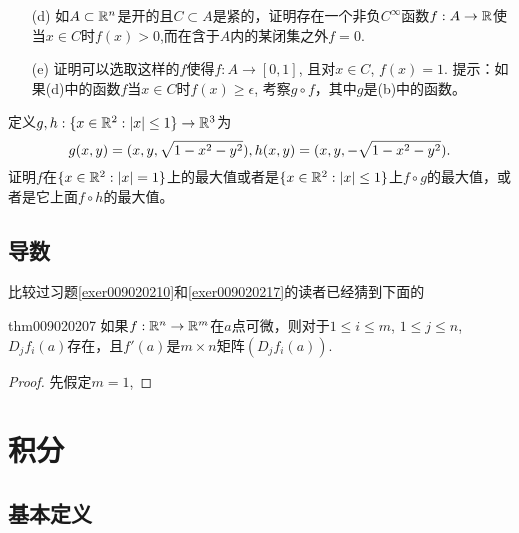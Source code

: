 \begin{problemset}
\begin{enumerate}
\item[(d)] 如$A \subset \mathbb{R}^n$是开的且$C \subset A$是紧的，证明存在一个非负$C^{\infty}$函数$f:A \to \mathbb{R}$使当$x \in C$时$f(x) > 0$,而在含于$A$内的某闭集之外$f = 0$.

\item[(e)] 证明可以选取这样的$f$使得$f:A \to [0, 1]$, 且对$x \in C$, $f(x)=1$. 提示：如果(d)中的函数$f$当$x \in C$时$f(x) \ge \epsilon$, 考察$g \circ f$，其中$g$是(b)中的函数。
\end{enumerate}

\item\label{exer009020227} 定义$g,h:\{x \in \mathbb{R}^2 : |x| \le 1\} \to \mathbb{R}^3$为
\begin{equation*}
g(x, y) = (x, y, \sqrt{1 - x^2 - y^2}),\\
h(x, y) = (x, y, -\sqrt{1 - x^2 - y^2}).
\end{equation*}
证明$f$在$\{x \in \mathbb{R}^2 : |x| = 1\}$上的最大值或者是$\{x \in \mathbb{R}^2:|x| \le 1\}$上$f \circ g$的最大值，或者是它上面$f \circ h$的最大值。


\end{problemset}

\section{导数}\label{section0090204}
比较过习题\ref{exer009020210}和\ref{exer009020217}的读者已经猜到下面的
\begin{theorem}{}{thm009020207}
如果$f:\mathbb{R}^n \to \mathbb{R}^m$在$a$点可微，则对于$1 \le i \le m$, $1 \le j \le n$, $D_jf_i(a)$存在，且$f'(a)$是$m \times n$矩阵$(D_jf_i(a))$.
\end{theorem}
\begin{proof}
先假定$m=1$,
\end{proof}

\chapter{积分}\label{chapter00903}
\section{基本定义}\label{section0090301}





